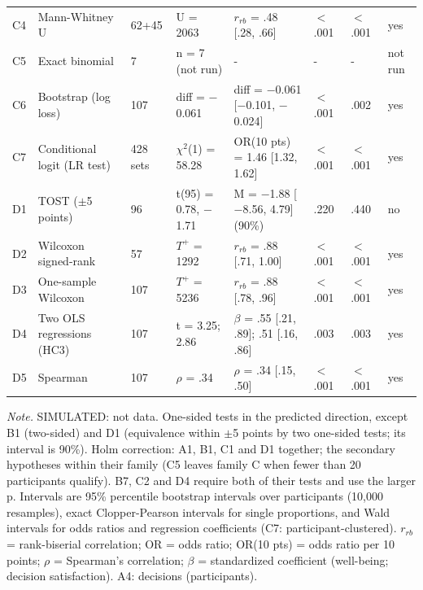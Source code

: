 \begin{table}[htbp]
\begin{threeparttable}
\begin{tabular}{llllllll}
C4 & Mann-Whitney U & 62+45 & U = 2063 & $r_{rb}$ = .48 [.28, .66] & $<$ .001 & $<$ .001 & yes \\
C5 & Exact binomial & 7 & n = 7 (not run) & - & - & - & not run \\
C6 & Bootstrap (log loss) & 107 & diff = $-$0.061 & diff = $-$0.061 [$-$0.101, $-$0.024] & $<$ .001 & .002 & yes \\
C7 & Conditional logit (LR test) & 428 sets & $\chi^2$(1) = 58.28 & OR(10 pts) = 1.46 [1.32, 1.62] & $<$ .001 & $<$ .001 & yes \\
D1 & TOST ($\pm$5 points) & 96 & t(95) = 0.78, $-$1.71 & M = $-$1.88 [$-$8.56, 4.79] (90\%) & .220 & .440 & no \\
D2 & Wilcoxon signed-rank & 57 & $T^{+}$ = 1292 & $r_{rb}$ = .88 [.71, 1.00] & $<$ .001 & $<$ .001 & yes \\
D3 & One-sample Wilcoxon & 107 & $T^{+}$ = 5236 & $r_{rb}$ = .88 [.78, .96] & $<$ .001 & $<$ .001 & yes \\
D4 & Two OLS regressions (HC3) & 107 & t = 3.25; 2.86 & $\beta$ = .55 [.21, .89]; .51 [.16, .86] & .003 & .003 & yes \\
D5 & Spearman & 107 & $\rho$ = .34 & $\rho$ = .34 [.15, .50] & $<$ .001 & $<$ .001 & yes \\
\bottomrule
\end{tabular}
\begin{tablenotes}[flushleft]
\footnotesize
\item \textit{Note.} SIMULATED: not data. One-sided tests in the predicted direction, except B1 (two-sided) and D1 (equivalence within $\pm$5 points by two one-sided tests; its interval is 90\%). Holm correction: A1, B1, C1 and D1 together; the secondary hypotheses within their family (C5 leaves family C when fewer than 20 participants qualify). B7, C2 and D4 require both of their tests and use the larger p. Intervals are 95\% percentile bootstrap intervals over participants (10,000 resamples), exact Clopper-Pearson intervals for single proportions, and Wald intervals for odds ratios and regression coefficients (C7: participant-clustered). $r_{rb}$ = rank-biserial correlation; OR = odds ratio; OR(10 pts) = odds ratio per 10 points; $\rho$ = Spearman's correlation; $\beta$ = standardized coefficient (well-being; decision satisfaction). A4: decisions (participants).
\end{tablenotes}
\end{threeparttable}
\end{table}
